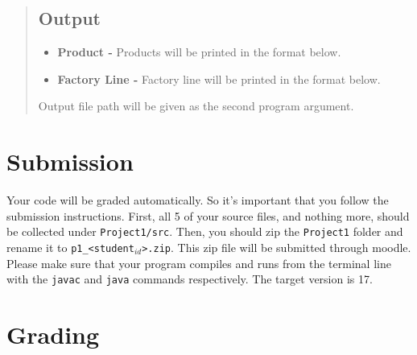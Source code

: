 \documentclass[12pt]{article}
\begin{document}
\begin{quote}
\subsection{Output}

\begin{itemize}
    \item \textbf{Product - } Products will be printed in the format below. \\ [10pt]
    \vspace{7pt}
    
    \item \textbf{Factory Line - } Factory line will be printed in the format below. \\ [10pt]
    \vspace{7pt}
    
\end{itemize}
\vspace{-5pt}
Output file path will be given as the second program argument.

\end{quote}

\section{Submission}

Your code will be graded automatically. So it's important that you follow the submission instructions. First, all 5 of your source files, and nothing more, should be collected under \verb|Project1/src|. Then, you should zip the \verb|Project1| folder and rename it to \texttt{p1\_<student$_{id}$>.zip}. This zip file will be submitted through moodle. \\

Please make sure that your program compiles and runs from the terminal line with the \texttt{javac} and \texttt{java} commands respectively. The target version is 17. 

\section{Grading}
\end{document}

